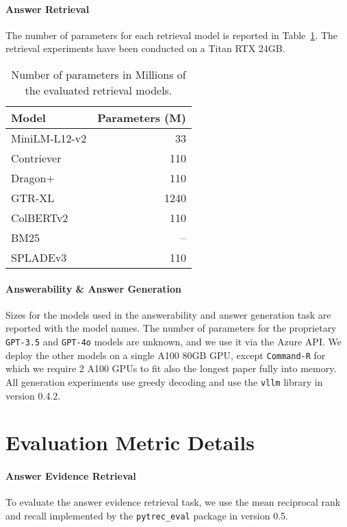\paragraph{Answer Retrieval}
The number of parameters for each retrieval model is reported in Table~\ref{tbl:ir-models-parameters}. The retrieval experiments have been conducted on a Titan RTX 24GB.
\begin{table}[!h]
\small
\centering
\begin{tabular}{@{}lr@{}}
\toprule
Model & Parameters (M) \\ \midrule
MiniLM-L12-v2 & 33 \\
Contriever & 110 \\
Dragon+ & 110 \\
GTR-XL & 1240 \\
ColBERTv2 & 110 \\
BM25 & -- \\
SPLADEv3 & 110 \\ \bottomrule
\end{tabular}
\caption{Number of parameters in Millions of the evaluated retrieval models.}\label{tbl:ir-models-parameters}
\end{table}

\paragraph{Answerability \& Answer Generation}
Sizes for the models used in the answerability and answer generation task are reported with the model names. The number of parameters for the proprietary \texttt{GPT-3.5} and \texttt{GPT-4o} models are unknown, and we use it via the Azure API. We deploy the other models on a single A100 80GB GPU, except \texttt{Command-R} for which we require 2 A100 GPUs to fit also the longest paper fully into memory. All generation experiments use greedy decoding and use the \texttt{vllm} library \citep{kwon2023efficient} in version 0.4.2.

\section{Evaluation Metric Details}\label{sec:appendix-evaluation-metric-details}
\paragraph{Answer Evidence Retrieval}
To evaluate the answer evidence retrieval task, we use the mean reciprocal rank and recall implemented by the \texttt{pytrec\_eval} \citep{VanGysel2018pytreceval} package in version 0.5.

